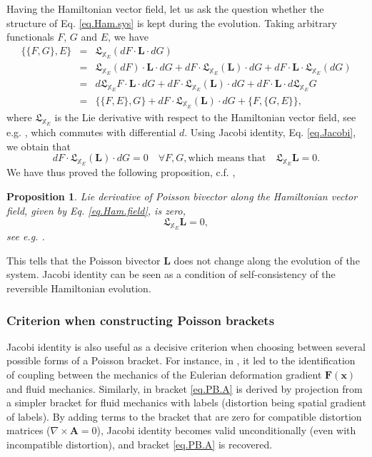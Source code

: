 \documentclass[
10pt, %
a4paper, %
oneside, %
headinclude,footinclude, %
BCOR5mm, %
]{scrartcl}
\newcommand{\xx}{\mathbf{x}}
\newcommand{\XXXX}{\boldsymbol{\mathbb{X}}}
\newcommand{\FF}{\mathbf{F}}
\renewcommand{\AA}{\mathbf{A}}
\newcommand{\LL}{\mathbf{L}}
\newcommand{\Lie}{\mathfrak{L}}
\newcommand{\Ffunc}{F}
\newcommand{\Gfunc}{G}
\newtheorem{prop}{Proposition}
\begin{document}
Having the Hamiltonian vector field, let us ask the question whether the structure of Eq. \eqref{eq.Ham.sys} is kept during the evolution.
Taking arbitrary functionals $\Ffunc$, $\Gfunc$ and $E$, we have
\begin{eqnarray}
\{\{\Ffunc,\Gfunc\},E\}&=&\Lie_{\XXXX_E}(d\Ffunc \cdot \LL \cdot d\Gfunc)  
\nonumber\\
&=&\Lie_{\XXXX_E} (d\Ffunc) \cdot \LL \cdot d\Gfunc
+d\Ffunc \cdot \Lie_{\XXXX_E} (\LL) \cdot d\Gfunc
+d\Ffunc \cdot \LL \cdot \Lie_{\XXXX_E} (d\Gfunc) \nonumber\\
&=&
d \Lie_{\XXXX_E} \Ffunc \cdot \LL \cdot d\Gfunc
+d\Ffunc \cdot \Lie_{\XXXX_E} (\LL) \cdot d\Gfunc
+d\Ffunc \cdot \LL \cdot d \Lie_{\XXXX_E} \Gfunc \nonumber\\
&=&\{\{\Ffunc,E\},\Gfunc\} +d\Ffunc \cdot \Lie_{\XXXX_E} (\LL) \cdot d\Gfunc + 
\{\Ffunc,\{\Gfunc,E\}\},
\end{eqnarray}
where $\Lie_{\XXXX_E}$ is the Lie derivative with respect to the Hamiltonian vector field, see e.g. \cite{Fecko}, which commutes with differential $d$. 
Using Jacobi identity, Eq. \eqref{eq.Jacobi}, we obtain that 
\begin{equation}
d\Ffunc \cdot \Lie_{\XXXX_E} (\LL) \cdot d\Gfunc = 0 \quad\forall \Ffunc, \Gfunc,
\mbox{which means that}\quad 
\Lie_{\XXXX_E}\LL = 0.
\end{equation}
We have thus proved the following proposition, c.f. \cite{Marle2014}, 
\begin{prop}\label{prop.Lie.bivector}
Lie derivative of Poisson bivector along the Hamiltonian vector field, given by Eq. \eqref{eq.Ham.field}, is zero,
\begin{equation}\label{eq.Jac.Lie}
	\Lie_{\XXXX_E}\LL = 0,
\end{equation}
see e.g. \cite{Marle2014}.
\end{prop}
This tells that the Poisson bivector $\LL$ does not change along the evolution of the system. Jacobi identity can be seen as a condition of self-consistency of the reversible Hamiltonian evolution.

\subsubsection{Criterion when constructing Poisson brackets}
Jacobi identity is also useful as a decisive criterion when choosing between 
several possible forms of a Poisson bracket. For instance, in 
\cite{Markus2009}, it led to the identification of coupling between the 
mechanics of the Eulerian deformation gradient $\FF(\xx)$ and fluid mechanics. 
Similarly, in \cite{SHTC-GENERIC}  bracket \eqref{eq.PB.A} is derived by 
projection from a simpler bracket for fluid mechanics with labels (distortion 
being spatial gradient of labels). By adding terms to the bracket that are zero 
for compatible distortion matrices ($\nabla\times\AA=0$), Jacobi identity 
becomes valid unconditionally (even with incompatible distortion), and bracket 
\eqref{eq.PB.A} is recovered.
\end{document}
